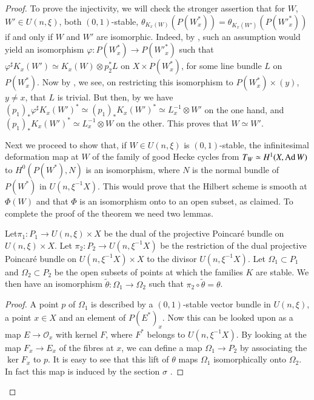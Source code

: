 \begin{proof}
To prove the injectivity, we will check the stronger assertion that
for $W$, $W'\in U(n,\xi)$, both $(0,1)$-stable,
$\theta_{K_{x}(W)}(P(W^{*}_{x}))=\theta_{K_{x}(W')}(P({W'}_{x}^{*}))$ if
and only if $W$ and $W'$ are isomorphic. Indeed, by \cite[Lemma
2.5]{art05-key6}, such an assumption would yield an isomorphism
$\varphi:P(W^{*}_{x})\to P({W'}^{*}_{x})$ such that
$\varphi^{\sharp}K_{x}(W')\simeq K_{x}(W)\otimes p^{*}_{2}L$ on
$X\times P(W^{*}_{x})$, for some line bundle $L$ on
$P(W^{*}_{x})$. Now by \cite[Remark 4.7]{art05-key5}, we see, on
restricting this isomorphism to $P(W^{*}_{x})\times (y)$, $y\neq x$,
that $L$ is trivial. But then, by \cite[Lemma 4.3]{art05-key5} we have
$(p_{1})_{*}\varphi^{\sharp}K_{x}(W')^{*}\simeq
(p_{1})_{*}K_{x}(W')^{*}\simeq L_{x}^{-1}\otimes W'$ on the one hand,
and $(p_{1})_{*}K_{x}(W')^{*}\simeq L_{x}^{-1}\otimes W$ on the
other. This proves that $W\simeq W'$. 

Next we proceed to show that, if $W\in U(n,\xi)$ is $(0,1)$-stable,
the infinitesimal deformation map at $W$ of the family of good Hecke
cycles from $T_{W}\simeq H^{1}(X,\operatorname{Ad} W)$ to $H^{0}(P(W^{*}),N)$ is an
isomorphism, where $N$ is the normal bundle of $P(W^{*})$ in
$U(n,\xi^{-1}X)$. This would prove that the Hilbert scheme is smooth
at $\Phi(W)$ and that $\Phi$ is an isomorphism onto to an open subset,
as claimed. To complete the proof of the theorem we need two lemmas. 


\begin{lemma}\label{art05-lem5.14}
Let\pageoriginale $\pi_{1}:P_{1}\to U(n,\xi)\times X$ be the dual of
the projective Poincar\'e bundle on $U(n,\xi)\times X$. Let
$\pi_{2}:P_{2}\to U(n,\xi^{-1}X)$ be the restriction of the dual
projective Poincar\'e bundle on $U(n,\xi^{-1}X)\times X$ to the
divisor $U(n,\xi^{-1}X)$. Let $\Omega_{1}\subset P_{1}$ and
$\Omega_{2}\subset P_{2}$ be the open subsets of points at which the
families $K$ are stable. We then have an isomorphism
$\widetilde{\theta}:\Omega_{1}\to \Omega_{2}$ such that
$\pi_{2}\circ \widetilde{\theta}=\theta$. 
\end{lemma}

\begin{proof}
A point $p$ of $\Omega_{1}$ is described by a $(0,1)$-stable vector
bundle in $U(n,\xi)$, a point $x\in X$ and an element of
$P(E^{*})_{x}$. Now this can be looked upon as a map
$E\to \mathscr{O}_{x}$ with kernel $F$, where $F^{*}$ belongs to
$U(n,\xi^{-1}X)$. By looking at the map $F_{x}\to E_{x}$ of the fibres
at $x$, we can define a map $\Omega_{1}\to P_{2}$ by associating the
$\ker F_{x}$ to $p$. It is easy to see that this lift of $\theta$ maps
$\Omega_{1}$ isomorphically onto $\Omega_{2}$. In fact this map is
induced by the section $\sigma$ \cite[p. 402]{art05-key5}. 
\end{proof}


\end{proof}

